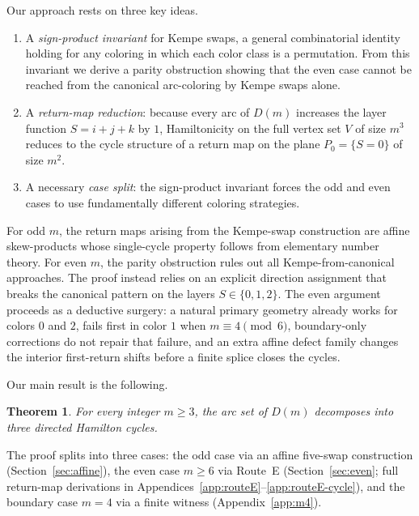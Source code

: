 \documentclass[11pt]{article}
\newtheorem{theorem}{Theorem}
\begin{document}
Our approach rests on three key ideas.
\begin{enumerate}[label=\textup{(\roman*)},leftmargin=2.5em]
\item A \emph{sign-product invariant} for Kempe swaps, a general combinatorial identity holding for any coloring in which each color class is a permutation.
From this invariant we derive a parity obstruction showing that the even case cannot be reached from the canonical arc-coloring by Kempe swaps alone.
\item A \emph{return-map reduction}: because every arc of $D(m)$ increases the layer function $S=i+j+k$ by $1$, Hamiltonicity on the full vertex set $V$ of size $m^3$ reduces to the cycle structure of a return map on the plane $P_0=\{S=0\}$ of size $m^2$.
\item A necessary \emph{case split}: the sign-product invariant forces the odd and even cases to use fundamentally different coloring strategies.
\end{enumerate}
For odd $m$, the return maps arising from the Kempe-swap construction are affine skew-products whose single-cycle property follows from elementary number theory.
For even $m$, the parity obstruction rules out all Kempe-from-canonical approaches.
The proof instead relies on an explicit direction assignment that breaks the canonical pattern on the layers $S\in\{0,1,2\}$.
The even argument proceeds as a deductive surgery: a natural primary geometry already works for colors $0$ and $2$, fails first in color $1$ when $m\equiv 4\pmod 6$, boundary-only corrections do not repair that failure, and an extra affine defect family changes the interior first-return shifts before a finite splice closes the cycles.

Our main result is the following.

\begin{theorem}\label{thm:main-all}
For every integer $m\ge 3$, the arc set of $D(m)$ decomposes into three directed Hamilton cycles.
\end{theorem}

The proof splits into three cases: the odd case via an affine five-swap construction (Section~\ref{sec:affine}), the even case $m\ge 6$ via Route~E (Section~\ref{sec:even}; full return-map derivations in Appendices~\ref{app:routeE}--\ref{app:routeE-cycle}), and the boundary case $m=4$ via a finite witness (Appendix~\ref{app:m4}).
\end{document}
